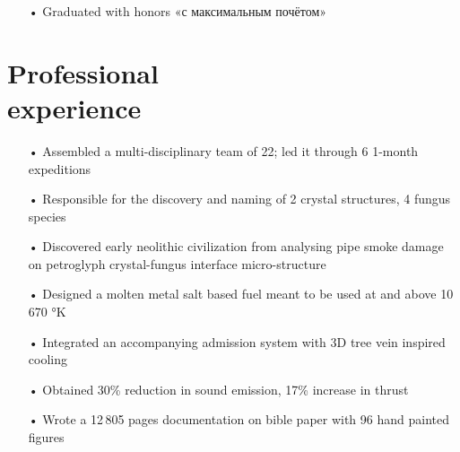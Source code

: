 \documentclass{cv}
\begin{document}
		\begin{position}[title={Bachelor's degree in Rocket Fuel Mixing},
		                 institution={Insitute for Advanced Rocket Design, Baïkal},
		                 country=Russia,
		                 from=2003,
		                 to=2004]
			\vspace{-\baselineskip} %
			\begin{itemize}
				\item[•] Graduated with honors «{с максимальным почётом}»
			\end{itemize}
		\end{position}

	\section{Professional\\
	         experience}
		\begin{position}[title={Lead petroglyph micro-structure analyst},
		                 institution={The Fire Earth Company},
		                 country=Chili,
		                 from=2007,
		                 to=present]
			\vspace{-\baselineskip} %
			\begin{itemize}
				\item[•] Assembled a multi-disciplinary team of 22; led it through 6 1-month expeditions
				\item[•] Responsible for the discovery and naming of 2 crystal structures, 4 fungus species
				\item[•] Discovered early neolithic civilization from analysing pipe smoke damage on petroglyph crystal-fungus interface micro-structure
			\end{itemize}
		\end{position}

		\vspace{0.3\baselineskip} %

		\begin{position}[title={Internship at Mars Exploration},
		                 institution={Mars exploration company},
		                 country=United States of America,
		                 from=March,
		                 to={September 2004}]
			\vspace{-\baselineskip} %
			\begin{itemize}
				\item[•] Designed a molten metal salt based fuel meant to be used at and above 10\,670 °K
				\item[•] Integrated an accompanying admission system with {3}D tree vein inspired cooling
				\item[•] Obtained 30\% reduction in sound emission, 17\% increase in thrust
				\item[•] Wrote a 12\,805 pages documentation on bible paper with 96 hand painted figures
			\end{itemize}
		\end{position}
\end{document}
